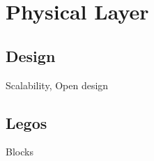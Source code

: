 \section{Physical Layer} \label{sec:physical}

\subsection{Design}
Scalability, Open design

\subsection{Legos}
Blocks
